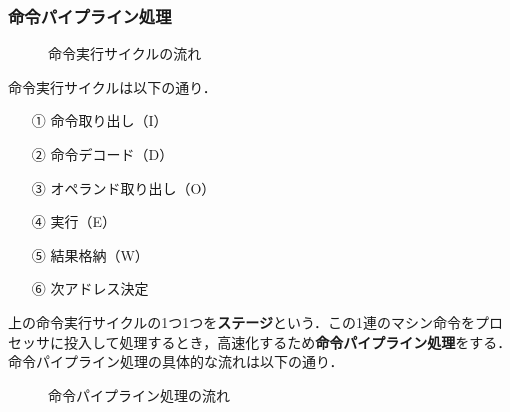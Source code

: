 \subsubsection{命令パイプライン処理}\label{sec27-2-B-7}

\begin{figure}[H]
	\begin{center}
		\caption{命令実行サイクルの流れ}
		\label{fig27-2}
	\end{center}
\end{figure}

命令実行サイクルは以下の通り．

\begin{enumerate}[labelsep=10pt, leftmargin=23pt]
	\item[①] 命令取り出し（I）
	\item[②] 命令デコード（D）
	\item[③] オペランド取り出し（O）
	\item[④] 実行（E）
	\item[⑤] 結果格納（W）
	\item[⑥] 次アドレス決定
\end{enumerate}

上の命令実行サイクルの1つ1つを\textbf{ステージ}という．この1連のマシン命令をプロセッサに投入して処理するとき，高速化するため\textbf{命令パイプライン処理}をする．命令パイプライン処理の具体的な流れは以下の通り．

\begin{figure}[H]
	\begin{center}
		\caption{命令パイプライン処理の流れ}
		\label{fig27-3}
	\end{center}
\end{figure}

